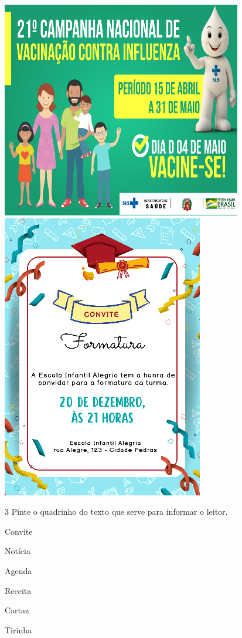 
\includegraphics[width=.5\textwidth]{media/image100.png}
\includegraphics[width=.5\textwidth]{media/image103.png}


\num{3} Pinte o quadrinho do texto que serve para informar o leitor.


\begin{boxlist}
 Convite

 Notícia

 Agenda 

 Receita

 Cartaz 

 Tirinha
\end{boxlist}

